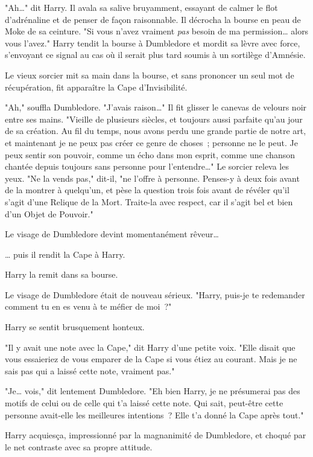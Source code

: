 "Ah…" dit Harry. Il avala sa salive bruyamment, essayant de calmer le flot d'adrénaline et de penser de façon raisonnable. Il décrocha la bourse en peau de Moke de sa ceinture. "Si vous n'avez vraiment \emph{pas} besoin de ma permission… alors vous l'avez." Harry tendit la bourse à Dumbledore et mordit sa lèvre avec force, s'envoyant ce signal au cas où il serait plus tard soumis à un sortilège d'Amnésie.

Le vieux sorcier mit sa main dans la bourse, et sans prononcer un seul mot de récupération, fit apparaître la Cape d'Invisibilité.

"Ah," souffla Dumbledore. "J'avais raison…" Il fit glisser le canevas de velours noir entre ses mains. "Vieille de plusieurs siècles, et toujours aussi parfaite qu'au jour de sa création. Au fil du temps, nous avons perdu une grande partie de notre art, et maintenant je ne peux pas créer ce genre de choses~; personne ne le peut. Je peux sentir son pouvoir, comme un écho dans mon esprit, comme une chanson chantée depuis toujours sans personne pour l'entendre…" Le sorcier releva les yeux. "Ne la vends pas," dit-il, "ne l'offre à personne. Penses-y à deux fois avant de la montrer à quelqu'un, et pèse la question trois fois avant de révéler qu'il s'agit d'une Relique de la Mort. Traite-la avec respect, car il s'agit bel et bien d'un Objet de Pouvoir."

Le visage de Dumbledore devint momentanément rêveur…

… puis il rendit la Cape à Harry.

Harry la remit dans sa bourse.

Le visage de Dumbledore était de nouveau sérieux. "Harry, puis-je te redemander comment tu en es venu à te méfier de moi~?"

Harry se sentit brusquement honteux.

"Il y avait une note avec la Cape," dit Harry d'une petite voix. "Elle disait que vous essaieriez de vous emparer de la Cape si vous étiez au courant. Mais je ne sais pas qui a laissé cette note, vraiment pas."

"Je… vois," dit lentement Dumbledore. "Eh bien Harry, je ne présumerai pas des motifs de celui ou de celle qui t'a laissé cette note. Qui sait, peut-être cette personne avait-elle les meilleures intentions~? Elle t'a donné la Cape après tout."

Harry acquiesça, impressionné par la magnanimité de Dumbledore, et choqué par le net contraste avec sa propre attitude.

